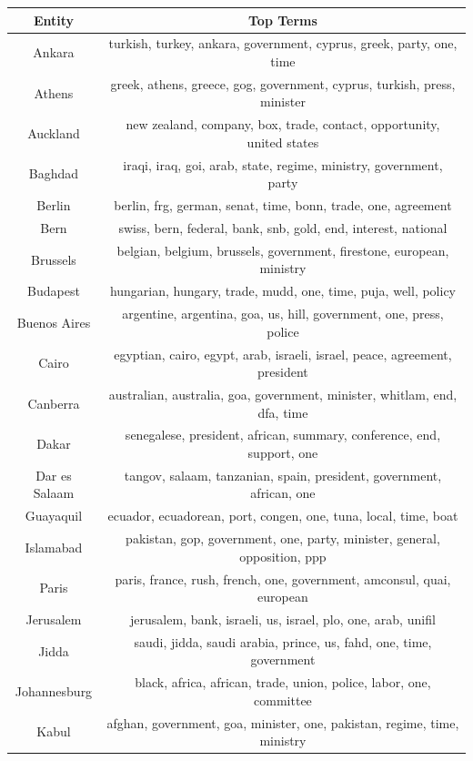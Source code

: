 \begin{table}
\centering
\small
\begin{tabular}{cc}
\toprule
\textbf{Entity} & \textbf{Top Terms} \\
\midrule
Ankara & turkish, turkey, ankara, government, cyprus, greek, party, one, time \\
Athens & greek, athens, greece, gog, government, cyprus, turkish, press, minister \\
Auckland & new zealand, company, box, trade, contact, opportunity, united states \\
Baghdad & iraqi, iraq, goi, arab, state, regime, ministry, government, party \\
Berlin & berlin, frg, german, senat, time, bonn, trade, one, agreement \\
Bern & swiss, bern, federal, bank, snb, gold, end, interest, national \\
Brussels & belgian, belgium, brussels, government, firestone, european, ministry \\
Budapest & hungarian, hungary, trade, mudd, one, time, puja, well, policy \\
Buenos Aires & argentine, argentina, goa, us, hill, government, one, press, police \\
Cairo & egyptian, cairo, egypt, arab, israeli, israel, peace, agreement, president \\
Canberra & australian, australia, goa, government, minister, whitlam, end, dfa, time \\
Dakar & senegalese, president, african, summary, conference, end, support, one \\
Dar es Salaam & tangov, salaam, tanzanian, spain, president, government, african, one \\
Guayaquil & ecuador, ecuadorean, port, congen, one, tuna, local, time, boat \\
Islamabad & pakistan, gop, government, one, party, minister, general, opposition, ppp \\
Paris & paris, france, rush, french, one, government, amconsul, quai, european \\
Jerusalem & jerusalem, bank, israeli, us, israel, plo, one, arab, unifil \\
Jidda & saudi, jidda, saudi arabia, prince, us, fahd, one, time, government \\
Johannesburg & black, africa, african, trade, union, police, labor, one, committee \\
Kabul & afghan, government, goa, minister, one, pakistan, regime, time, ministry \\

\end{tabular}
\end{table}
